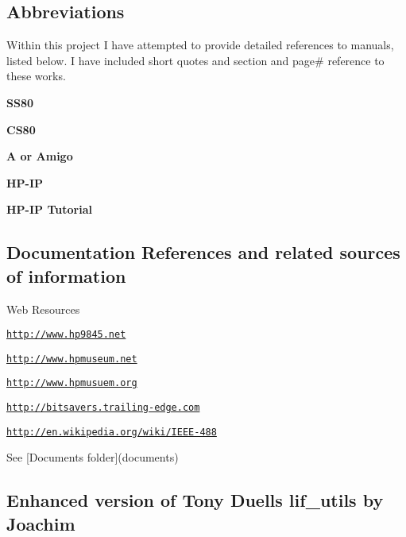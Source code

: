 \begin{DoxyItemize}
\begin{DoxyItemize}
\begin{DoxyItemize}
\begin{DoxyItemize}
\begin{DoxyItemize}
\begin{DoxyItemize}
 \section*{Abbreviations}
\end{DoxyItemize}

Within this project I have attempted to provide detailed references to manuals, listed below. I have included short quotes and section and page\# reference to these works.
\end{DoxyItemize}
\end{DoxyItemize}
\end{DoxyItemize}
\end{DoxyItemize}
\item {\bfseries S\+S80}
\item {\bfseries C\+S80}
\item {\bfseries A or Amigo}
\item {\bfseries H\+P-\/\+IP}
\item {\bfseries H\+P-\/\+IP Tutorial}
\end{DoxyItemize}



 \subsection*{Documentation References and related sources of information}


\begin{DoxyItemize}
\item Web Resources
\begin{DoxyItemize}
\item \href{http://www.hp9845.net}{\tt http\+://www.\+hp9845.\+net}
\item \href{http://www.hpmuseum.net}{\tt http\+://www.\+hpmuseum.\+net}
\item \href{http://www.hpmusuem.org}{\tt http\+://www.\+hpmusuem.\+org}
\item \href{http://bitsavers.trailing-edge.com}{\tt http\+://bitsavers.\+trailing-\/edge.\+com}
\item \href{http://en.wikipedia.org/wiki/IEEE-488}{\tt http\+://en.\+wikipedia.\+org/wiki/\+I\+E\+E\+E-\/488}
\item See \mbox{[}Documents folder\mbox{]}(documents)
\end{DoxyItemize}
\end{DoxyItemize}



 \subsection*{Enhanced version of Tony Duell\textquotesingle{}s lif\+\_\+utils by Joachim}


